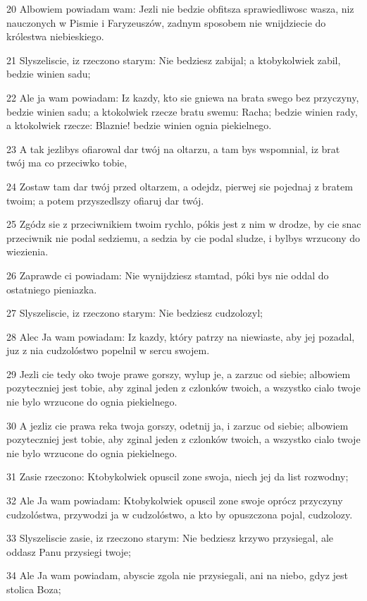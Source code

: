 \par 20 Albowiem powiadam wam: Jezli nie bedzie obfitsza sprawiedliwosc wasza, niz nauczonych w Pismie i Faryzeuszów, zadnym sposobem nie wnijdziecie do królestwa niebieskiego.
\par 21 Slyszeliscie, iz rzeczono starym: Nie bedziesz zabijal; a ktobykolwiek zabil, bedzie winien sadu;
\par 22 Ale ja wam powiadam: Iz kazdy, kto sie gniewa na brata swego bez przyczyny, bedzie winien sadu; a ktokolwiek rzecze bratu swemu: Racha; bedzie winien rady, a ktokolwiek rzecze: Blaznie! bedzie winien ognia piekielnego.
\par 23 A tak jezlibys ofiarowal dar twój na oltarzu, a tam bys wspomnial, iz brat twój ma co przeciwko tobie,
\par 24 Zostaw tam dar twój przed oltarzem, a odejdz, pierwej sie pojednaj z bratem twoim; a potem przyszedlszy ofiaruj dar twój.
\par 25 Zgódz sie z przeciwnikiem twoim rychlo, pókis jest z nim w drodze, by cie snac przeciwnik nie podal sedziemu, a sedzia by cie podal sludze, i bylbys wrzucony do wiezienia.
\par 26 Zaprawde ci powiadam: Nie wynijdziesz stamtad, póki bys nie oddal do ostatniego pieniazka.
\par 27 Slyszeliscie, iz rzeczono starym: Nie bedziesz cudzolozyl;
\par 28 Alec Ja wam powiadam: Iz kazdy, który patrzy na niewiaste, aby jej pozadal, juz z nia cudzolóstwo popelnil w sercu swojem.
\par 29 Jezli cie tedy oko twoje prawe gorszy, wylup je, a zarzuc od siebie; albowiem pozyteczniej jest tobie, aby zginal jeden z czlonków twoich, a wszystko cialo twoje nie bylo wrzucone do ognia piekielnego.
\par 30 A jezliz cie prawa reka twoja gorszy, odetnij ja, i zarzuc od siebie; albowiem pozyteczniej jest tobie, aby zginal jeden z czlonków twoich, a wszystko cialo twoje nie bylo wrzucone do ognia piekielnego.
\par 31 Zasie rzeczono: Ktobykolwiek opuscil zone swoja, niech jej da list rozwodny;
\par 32 Ale Ja wam powiadam: Ktobykolwiek opuscil zone swoje oprócz przyczyny cudzolóstwa, przywodzi ja w cudzolóstwo, a kto by opuszczona pojal, cudzolozy.
\par 33 Slyszeliscie zasie, iz rzeczono starym: Nie bedziesz krzywo przysiegal, ale oddasz Panu przysiegi twoje;
\par 34 Ale Ja wam powiadam, abyscie zgola nie przysiegali, ani na niebo, gdyz jest stolica Boza;

